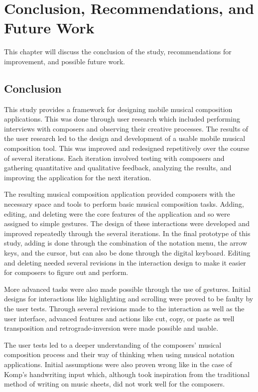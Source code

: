 
\chapter{Conclusion, Recommendations, and Future Work}

	This chapter will discuss the conclusion of the study, recommendations for improvement, and possible future work.

	\section{Conclusion}

		This study provides a framework for designing mobile musical composition applications. This was done through user research which included performing interviews with composers and observing their creative processes. The results of the user research led to the design and development of a usable mobile musical composition tool. This was improved and redesigned repetitively over the course of several iterations. Each iteration involved testing with composers and gathering quantitative and qualitative feedback, analyzing the results, and improving the application for the next iteration. 

		The resulting musical composition application provided composers with the necessary space and tools to perform basic musical composition tasks. Adding, editing, and deleting were the core features of the application and so were assigned to simple gestures. The design of these interactions were developed and improved repeatedly through the several iterations. In the final prototype of this study, adding is done through the combination of the notation menu, the arrow keys, and the cursor, but can also be done through the digital keyboard. Editing and deleting needed several revisions in the interaction design to make it easier for composers to figure out and perform. 

		More advanced tasks were also made possible through the use of gestures. Initial designs for interactions like highlighting and scrolling were proved to be faulty by the user tests. Through several revisions made to the interaction as well as the user interface, advanced features and actions like cut, copy, or paste as well transposition and retrograde-inversion were made possible and usable. 

		The user tests led to a deeper understanding of the composers' musical composition process and their way of thinking when using musical notation applications. Initial assumptions were also proven wrong like in the case of Komp's handwriting input which, although took inspiration from the traditional method of writing on music sheets, did not work well for the composers. 

